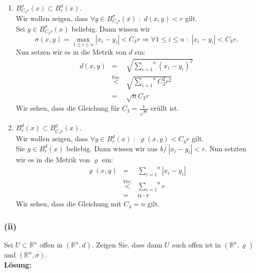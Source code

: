 \begin{enumerate}[\itshape a)]
    \item $B_{C_3r}^\sigma (x) \subset B_r^d (x)$.\\
        Wir wollen zeigen, dass $\forall y \in B_{C_3r}^\sigma (x) \; : \; d(x,y) < r$ gilt.\\
        Sei $y \in B_{C_3r}^\sigma (x)$ beliebig. Dann wissen wir
        $$
            \sigma (x,y) = \underset{1\leq i \leq n}{\max} |x_i - y_i| < C_3r \Rightarrow \forall 1 \leq i \leq n \; : \; |x_i - y_i| < C_3r.
        $$
        Nun setzen wir es in die Metrik von $d$ ein:
        $$\begin{array}{rcl}
            d(x,y)  &=& \sqrt{\overset{n}{\underset{i=1}{\sum}} (x_i - y_i)^2}\\
                    &\stackrel{Vor.}{<}& \sqrt{\overset{n}{\underset{i=1}{\sum}} C_3^2 r^2}\\
                    &=& \sqrt{n} C_3 r
        \end{array}$$
        Wir sehen, dass die Gleichung für $C_3 = \frac{1}{\sqrt{n}}$ erüllt ist.

    \item $B_r^d (x) \subset B_{C_4r}^\varrho (x)$.\\
        Wir wollen zeigen, dass $\forall y \in B_r^d (x) \; : \; \varrho (x,y) < C_4r$ gilt.\\
        Sie $y \in B_r^d (x)$ beliebig. Dann wissen wir aus \emph{b)} $|x_i - y_i| < r$.
        Nun setzten wir es in die Metrik von $\varrho$ ein:\\
        $$\begin{array}{rcl}
            \varrho (x,y)   &=& \overset{n}{\underset{i=1}{\sum}} | x_i - y_i |\\
                            &\stackrel{Vor.}{<}& \overset{n}{\underset{i=1}{\sum}} r\\
                            & = & n \cdot r
        \end{array}$$
        Wir sehen, dass die Gleichung mit $C_4 = n$ gilt.
\end{enumerate}

\subsubsection*{(ii)} 
Sei $U \subset \mathbb{R}^n$ offen in $(\mathbb{R}^n, d)$. Zeigen Sie, dass dann $U$ auch offen ist 
in $(\mathbb{R}^n, \varrho)$ und $(\mathbb{R}^n, \sigma)$.\\

\textbf{Lösung:}\\

